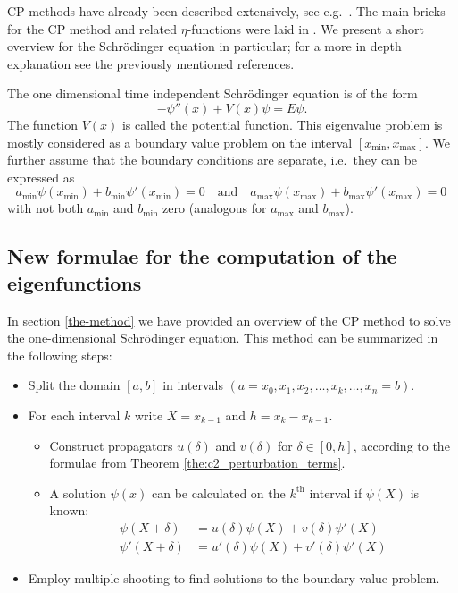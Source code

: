 CP methods have already been described extensively, see e.g.\ \cite{ixaru_numerical_1984,ixaru_cp_1998,ixaru_cp_2000,ledoux_cp_2004}. The main bricks for the CP method and related $\eta$-functions were laid in \cite{ixaru_numerical_1984}. We present a short overview for the Schrödinger equation in particular; for a more in depth explanation see the previously mentioned references.

The one dimensional time independent Schrödinger equation is of the form
$$
    -\psi''(x) + V(x)\psi = E\psi\text{.}
$$
The function $V(x)$ is called the potential function. This eigenvalue problem is mostly considered as a boundary value problem on the interval $[x_\text{min}, x_\text{max}]$. We further assume that the boundary conditions are separate, i.e.\ they can be expressed as
$$
    a_\text{min} \psi(x_\text{min}) + b_\text{min}\psi'(x_\text{min}) = 0
    \quad \mbox{and} \quad
    a_\text{max} \psi(x_\text{max}) + b_\text{max}\psi'(x_\text{max}) = 0\,
$$
with not both $a_\text{min}$ and $b_\text{min}$ zero (analogous for $a_\text{max}$ and $b_\text{max}$).


\subsection{New formulae for the computation of the eigenfunctions}\label{sec:c2_cp_in_delta}

In section \ref{the-method} we have provided an overview of the CP method to solve the one-dimensional Schrödinger equation. This method can be summarized in the following steps:
\begin{itemize}
    \item Split the domain $[a, b]$ in intervals $(a=x_0, x_1, x_2, \dots, x_k, \dots, x_n = b)$.
    \item For each interval $k$ write $X = x_{k-1}$ and $h = x_k - x_{k-1}$. \begin{itemize}
              \item Construct propagators $u(\delta)$ and $v(\delta)$ for $\delta \in [0, h]$, according to the formulae from Theorem \ref{the:c2_perturbation_terms}.
              \item A solution $\psi(x)$ can be calculated on the $k^\text{th}$ interval if $\psi(X)$ is known:
                    \begin{align*}
                        \psi(X+\delta)  & = u(\delta)\psi(X) + v(\delta)\psi'(X)   \\
                        \psi'(X+\delta) & = u'(\delta)\psi(X) + v'(\delta)\psi'(X)
                    \end{align*}
          \end{itemize}
    \item Employ multiple shooting to find solutions to the boundary value problem.
\end{itemize}

